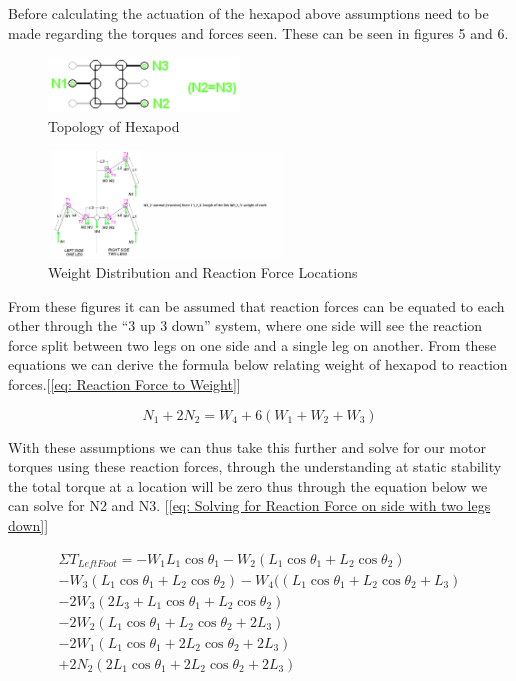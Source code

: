 Before calculating the actuation of the hexapod above assumptions need to be made regarding the torques and forces seen. These can be seen in figures 5 and 6.

\begin{figure}[h]

 \centering
   \includegraphics[width = 0.45\textwidth]{figures/12.png}            \caption{Topology of Hexapod}
   \label{fig: Diagram 2}
\end{figure}


\begin{figure}[h]

 \centering
   \includegraphics[width = 0.55\textwidth]{figures/1.png}            \caption{Weight Distribution and Reaction Force Locations}
   \label{fig: Diagram 3}
\end{figure}



From these figures it can be assumed that reaction forces can be equated to each other through the “3 up 3 down” system, where one side will see the reaction force split between two legs on one side and a single leg on another. From these equations we can derive the formula below relating weight of hexapod to reaction forces.[\ref{eq: Reaction Force to Weight}]


\begin{equation} \label{eq: Reaction Force to Weight}
N_1+2N_2 = W_4+ 6(W_1+W_2+W_3 )
\end{equation}

With these assumptions we can thus take this further and solve for our motor torques using these reaction forces, through the understanding at static stability the total torque at a location will be zero thus through the equation below we can solve for N2  and  N3.
 [\ref{eq: Solving for Reaction Force on side with two legs down}]


\begin{multline} \label{eq: Solving for Reaction Force on side with two legs down}
\Sigma T_{Left Foot} = -W_1 L_1 \cos \theta_1 - W_2 (L_1 \cos \theta_1 + L_2 \cos \theta_2)\\ - W_3 (L_1 \cos \theta_1 + L_2 \cos \theta_2) - W_4 ((L_1 \cos \theta_1 + L_2 \cos \theta_2 + L_3)\\ -2W_3 (2L_3 + L_1 \cos \theta_1 + L_2 \cos \theta_2)\\
- 2W_2 (L_1 \cos \theta_1 + L_2 \cos \theta_2 +2L_3)\\ - 2W_1 (L_1 \cos \theta_1 + 2L_2 \cos \theta_2 +2L_3)\\ + 2N_2 (2L_1 \cos \theta_1 + 2L_2 \cos \theta_2 +2L_3)
\end{multline}

